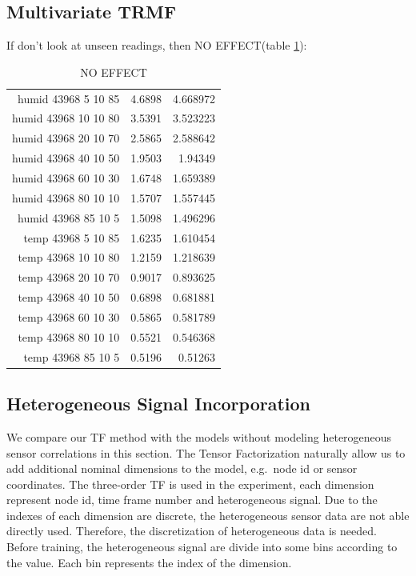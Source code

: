 \subsection{Multivariate TRMF}
If don't look at unseen readings, then NO EFFECT(table \ref{noEff}):

\begin{table}[htbp]
\caption{NO EFFECT}
\label{noEff}
\begin{tabular}{r r r}
humid 43968  5 10 85	&4.6898	&4.668972\\
humid 43968 10 10 80	&3.5391	&3.523223\\
humid 43968 20 10 70	&2.5865	&2.588642\\
humid 43968 40 10 50	&1.9503	&1.94349\\
humid 43968 60 10 30	&1.6748	&1.659389\\
humid 43968 80 10 10	&1.5707	&1.557445\\
humid 43968 85 10 5	&1.5098	&1.496296\\
temp 43968  5 10 85	&1.6235	&1.610454\\
temp 43968 10 10 80	&1.2159	&1.218639\\
temp 43968 20 10 70	&0.9017	&0.893625\\
temp 43968 40 10 50	&0.6898	&0.681881\\
temp 43968 60 10 30	&0.5865	&0.581789\\
temp 43968 80 10 10	&0.5521	&0.546368\\
temp 43968 85 10 5	&0.5196	&0.51263\\
\end{tabular}
\end{table}

\subsection{Heterogeneous Signal Incorporation}

We compare our TF method with the models without modeling heterogeneous sensor correlations in this section.
The Tensor Factorization naturally allow us to add additional nominal dimensions to the model, e.g.\ node id or sensor coordinates.
The three-order TF is used in the experiment, each dimension represent node id, time frame number and heterogeneous signal.  
Due to the indexes of each dimension are discrete, the heterogeneous sensor data are not able directly used.
Therefore, the discretization of heterogeneous data is needed.
Before training, the heterogeneous signal are divide into some bins according to the value.
Each bin represents the index of the dimension.


